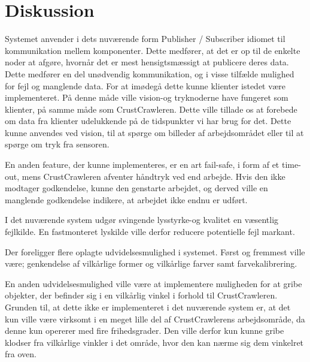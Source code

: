 \chapter{Diskussion}\label{chap:Diskussion}
Systemet anvender i dets nuværende form Publisher / Subscriber idiomet til kommunikation mellem komponenter.
Dette medfører, at det er op til de enkelte noder at afgøre, hvornår det er mest hensigtsmæssigt at publicere deres data.
Dette medfører en del unødvendig kommunikation, og i visse tilfælde mulighed for fejl og manglende data. 
For at imødegå dette kunne klienter istedet være implementeret.
På denne måde ville vision-og tryknoderne have fungeret som klienter, på samme måde som CrustCrawleren.
Dette ville tillade os at forebede om data fra klienter udelukkende på de tidspunkter vi har brug for det.
Dette kunne anvendes ved vision, til at spørge om billeder af arbejdsområdet eller til at spørge om tryk fra sensoren. 

En anden feature, der kunne implementeres, er en art fail-safe, i form af et time-out, mens CrustCrawleren afventer håndtryk ved end arbejde.
Hvis den ikke modtager godkendelse, kunne den genstarte arbejdet, og derved ville en manglende godkendelse indikere, at arbejdet ikke endnu er udført.

I det nuværende system udgør svingende lysstyrke-og kvalitet en væsentlig fejlkilde.
En fastmonteret lyskilde ville derfor reducere potentielle fejl markant.

Der foreligger flere oplagte udvidelsesmulighed i systemet.
Først og fremmest ville være; genkendelse af vilkårlige former og vilkårlige farver samt farvekalibrering.

En anden udvidelsesmulighed ville være at implementere muligheden for at gribe objekter, der befinder sig i en vilkårlig vinkel i forhold til CrustCrawleren.
Grunden til, at dette ikke er implementeret i det nuværende system er, at det kun ville være virksomt i en meget lille del af CrustCrawlerens arbejdsområde, da denne kun opererer med fire frihedsgrader.
Den ville derfor kun kunne gribe klodser fra vilkårlige vinkler i det område, hvor den kan nærme sig dem vinkelret fra oven. 